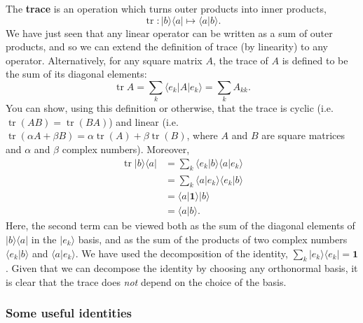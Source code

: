 \documentclass[fleqn]{article}
\begin{document}
The \textbf{trace} is an operation which turns outer products into inner products,
\[
  \operatorname{tr}\colon |b\rangle\langle a| \longmapsto \langle a|b\rangle.
\]
We have just seen that any linear operator can be written as a sum of outer products, and so we can extend the definition of trace (by linearity) to any operator.
Alternatively, for any square matrix \(A\), the trace of \(A\) is defined to be the sum of its diagonal elements:
\[
  \operatorname{tr}A = \sum_k \langle e_k|A|e_k\rangle = \sum_k A_{kk}.
\]
You can show, using this definition or otherwise, that the trace is cyclic (i.e.~\(\operatorname{tr}(AB) = \operatorname{tr}(BA)\)) and linear (i.e.~\(\operatorname{tr}(\alpha A+\beta B) = \alpha\operatorname{tr}(A)+\beta\operatorname{tr}(B)\), where \(A\) and \(B\) are square matrices and \(\alpha\) and \(\beta\) complex numbers).
Moreover,
\[
  \begin{aligned}
    \operatorname{tr}|b\rangle\langle a|
    &= \sum_k \langle e_k|b\rangle\langle a|e_k\rangle
  \\&= \sum_k \langle a|e_k\rangle\langle e_k|b\rangle
  \\&= \langle a|\mathbf{1}\rangle|b\rangle
  \\&= \langle a|b\rangle.
  \end{aligned}
\]
Here, the second term can be viewed both as the sum of the diagonal elements of \(|b\rangle\langle a|\) in the \(|e_k\rangle\) basis, and as the sum of the products of two complex numbers \(\langle e_k|b\rangle\) and \(\langle a|e_k\rangle\).
We have used the decomposition of the identity, \(\sum_k|e_k\rangle\langle e_k|=\mathbf{1}\).
Given that we can decompose the identity by choosing any orthonormal basis, it is clear that the trace does \emph{not} depend on the choice of the basis.

\hypertarget{some-useful-identities}{%
\subsubsection{Some useful identities}\label{some-useful-identities}}
\end{document}
